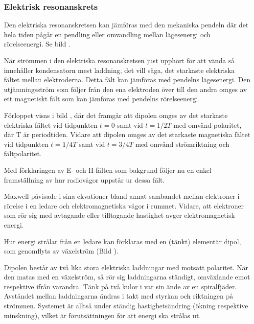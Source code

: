 \subsubsection{Elektrisk resonanskrets}

Den elektriska resonanskretsen kan jämföras med den mekaniska pendeln där det
hela tiden pågår en pendling eller omvandling mellan lägesenergi och
rörelseenergi.
Se bild .

När strömmen i den elektriska resonanskretsen just upphört för att vända så
innehåller kondensatorn mest laddning, det vill säga, det starkaste elektriska
fältet mellan elektroderna.
Detta fält kan jämföras med pendelns lägesenergi.
Den utjämningsström som följer från den ena elektroden över till den andra
omges av ett magnetiskt fält som kan jämföras med pendelns rörelseenergi.

Förloppet visas i bild , där det framgår att dipolen omges
av det starkaste elektriska fältet vid tidpunkten \(t=0\) samt vid
\(t=1/2T\) med omvänd polaritet, där T är periodtiden.
Vidare att dipolen omges av det starkaste magnetiska fältet vid tidpunkten
\(t=1/4T\) samt vid \(t=3/4T\) med omvänd strömriktning och fältpolaritet.



Med förklaringen av E- och H-fälten som bakgrund följer nu en enkel
framställning av hur radiovågor uppstår ur dessa fält.

Maxwell påvisade i sina ekvationer bland annat sambandet mellan elektroner
i rörelse i en ledare och elektromagnetiska vågor i rummet.
Vidare, att elektroner som rör sig med avtagande eller tilltagande hastighet
avger elektromagnetisk energi.

Hur energi strålar från en ledare kan förklaras med en (tänkt)
elementär dipol, som genomflyts av växelström (Bild ).

Dipolen består av två lika stora elektriska laddningar med motsatt polaritet.
När den matas med en växelström, så rör sig laddningarna ständigt,
omväxlande emot respektive ifrån varandra.
Tänk på två kulor i var sin ände av en spiralfjäder.
Avståndet mellan laddningarna ändras i takt med styrkan och riktningen på
strömmen.
Systemet är alltså under ständig hastighetsändring (ökning respektive
minskning), vilket är förutsättningen för att energi ska strålas ut.

